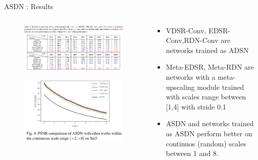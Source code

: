 \documentclass[
    xcolor={svgnames},
    hyperref={colorlinks,citecolor=OrangeRed,linkcolor=OrangeRed,urlcolor=DarkBlue}
    ]{beamer}
\begin{document}
\begin{frame}{ASDN : Results}
{\begin{columns}[onlytextwidth]
\begin{column}{0.5\textwidth}
\begin{figure}
                    \centering
                    \includegraphics[width=\textwidth, keepaspectratio]{asdn-table2.png}
                \end{figure}
                \begin{figure}
                    \centering
                    \includegraphics[width=\textwidth, keepaspectratio]{asdn-fig4.png}
                \end{figure}                    
            \end{column}
            \begin{column}{0.5\textwidth}
                \begin{center}
                    \begin{itemize}
                        \tiny
                        \item VDSR-Conv, EDSR-Conv,RDN-Conv are networks trained as ADSN
                        \item Meta-EDSR, Meta-RDN are networks with a meta-upscaling module trained with scales range between [1,4] with stride 0.1
                        \item ASDN and networks trained as ASDN perform better on continuos (random) scales between 1 and 8.

\end{itemize}
\end{center}
\end{column}
\end{columns}}
\end{frame}
\end{document}
